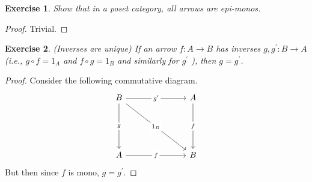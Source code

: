 \documentclass[a4paper, 11pt]{book}
\theoremstyle{plain}
\newtheorem{exercise}{Exercise}[chapter]
\theoremstyle{plain}
\newcommand{\arr}{\rightarrow}
\newcommand{\p}{\prime}
\begin{document}
  \begin{exercise}
    Show that in a poset category, all arrows are epi-monos.
  \end{exercise}
  \begin{proof}
    Trivial.
  \end{proof}

  \begin{exercise}
    (Inverses are unique) If an arrow $f: A \arr B$ has inverses $g, g^\p: B \arr A$ (i.e., $g \circ f=1_A$ and $f \circ g = 1_B$ and similarly for $g^\p$ ), then $g=g^\p$.
  \end{exercise}
  \begin{proof}
    Consider the following commutative diagram. 
    \[\begin{tikzcd}
      B &&& A \\
      \\
      \\
      A &&& B
      \arrow["g"{description}, from=1-1, to=4-1]
      \arrow["f"{description}, from=4-1, to=4-4]
      \arrow["f"{description}, from=1-4, to=4-4]
      \arrow["{g^\prime}"{description}, from=1-1, to=1-4]
      \arrow["{1_B}"{description}, from=1-1, to=4-4]
    \end{tikzcd}\]
    But then since $f$ is mono, $g=g^\p$.
  \end{proof}
\end{document}
